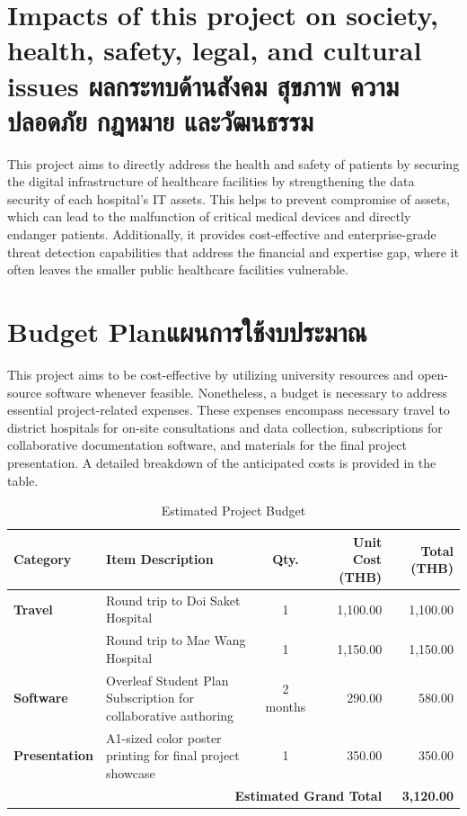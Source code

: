 \section{\ifenglish%
Impacts of this project on society, health, safety, legal, and cultural issues
\else%
ผลกระทบด้านสังคม สุขภาพ ความปลอดภัย กฎหมาย และวัฒนธรรม
\fi}

This project aims to directly address the health and safety of patients by securing the digital infrastructure of healthcare facilities by strengthening the data security of each hospital's IT assets. This helps to prevent compromise of assets, which can lead to the malfunction of critical medical devices and directly endanger patients. Additionally, it provides cost-effective and enterprise-grade threat detection capabilities that address the financial and expertise gap, where it often leaves the smaller public healthcare facilities vulnerable.

\section{\ifenglish Budget Plan\else แผนการใช้งบประมาณ\fi}
This project aims to be cost-effective by utilizing university resources and open-source software whenever feasible. Nonetheless, a budget is necessary to address essential project-related expenses. These expenses encompass necessary travel to district hospitals for on-site consultations and data collection, subscriptions for collaborative documentation software, and materials for the final project presentation. A detailed breakdown of the anticipated costs is provided in the table.

\begin{table}[h!]
\centering
\caption{Estimated Project Budget}
\label{tab:budget}
\begin{tabularx}{\linewidth}{@{} l >{\raggedright\arraybackslash}X c r r @{}}
\toprule
\textbf{Category} & \textbf{Item Description} & \textbf{Qty.} & \textbf{Unit Cost (THB)} & \textbf{Total (THB)} \\ \midrule
\textbf{Travel} & Round trip to Doi Saket Hospital & 1 & 1,100.00 & 1,100.00 \\
 & Round trip to Mae Wang Hospital & 1 & 1,150.00 & 1,150.00 \\ \addlinespace
\textbf{Software} & Overleaf Student Plan Subscription for collaborative authoring & 2 months & 290.00 & 580.00 \\ \addlinespace
\textbf{Presentation} & A1-sized color poster printing for final project showcase & 1 & 350.00 & 350.00 \\ \midrule[\heavyrulewidth]
\multicolumn{4}{r}{\textbf{Estimated Grand Total}} & \textbf{3,120.00} \\ \bottomrule
\end{tabularx}
\end{table}